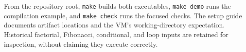 \documentclass[10pt,a4paper]{article}
\newcommand{\code}[1]{\texttt{\small #1}}
\begin{document}
From the repository root, \code{make} builds both executables, \code{make demo} runs the compilation example, and \code{make check} runs the focused checks. The setup guide documents artifact locations and the VM's working-directory expectation. Historical factorial, Fibonacci, conditional, and loop inputs are retained for inspection, without claiming they execute correctly.
\end{document}
